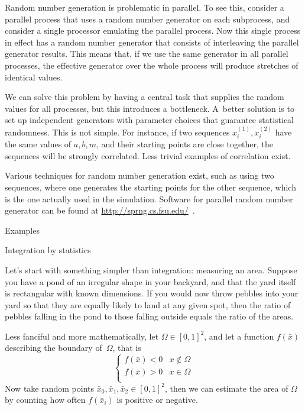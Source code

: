 Random number generation is problematic in parallel. To see this,
consider a parallel process that uses a random number generator on
each subprocess, and
consider a single processor emulating the parallel process. Now this
single process in effect has a random number generator that consists
of interleaving the parallel generator results. This means that, if we
use the same generator in all parallel processes, the effective
generator over the whole process will produce stretches of identical
values.

We can solve this problem by having a central task that supplies the
random values for all processes, but this introduces a
bottleneck. A~better solution is to set up independent generators with
parameter choices that guarantee statistical randomness. This is not
simple. For instance, if two sequences $x^{(1)}_i,x^{(2)}_i$ have the
same values of $a,b,m$, and their starting points are close together,
the sequences will be strongly correlated. Less trivial examples of
correlation exist.

Various techniques for random number generation exist, such as using
two sequences, where one generates the starting points for the other
sequence, which is the one actually used in the simulation. Software
for parallel random number generator can be found at
\url{http://sprng.cs.fsu.edu/}~\cite{Mascagni:SPRNG}.


 {Examples}

 {Integration by statistics}

Let's start with something simpler than integration: measuring an
area. Suppose you have a pond of an irregular shape in your backyard,
and that the yard itself is rectangular with known dimensions. If you
would now throw pebbles into your yard so that they are equally likely
to land at any given spot, then the ratio of pebbles falling in the
pond to those falling outside equals the ratio of the areas. 

Less
fanciful and more mathematically, let $\Omega\in[0,1]^2$, and let 
a function $f(\bar x)$ describing
the boundary of~$\Omega$, that is
\[ 
\begin{cases}
  f(\bar x)<0&x\not\in\Omega\\
  f(\bar x)>0&x\in\Omega\\
\end{cases}
\]
Now take random points $\bar x_0,\bar x_1,\bar x_2\in[0,1]^2$, then we
can estimate the area of $\Omega$ by counting how often $f(\bar x_i)$
is positive or negative.

